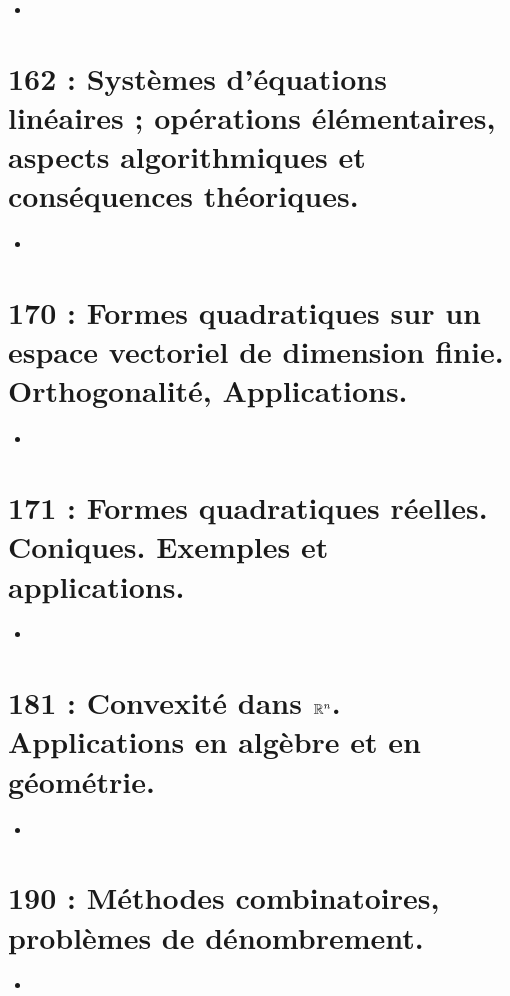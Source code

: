 \documentclass[a4paper,10pt,oneside,twocolumn,landscape]{book}
\begin{document}
\begin{itemize}
	\item 
\end{itemize}

\section{162 : Systèmes d’équations linéaires ; opérations élémentaires, aspects algorithmiques et conséquences théoriques.}

\begin{itemize}
	\item 
\end{itemize}

\section{170 : Formes quadratiques sur un espace vectoriel de dimension finie. Orthogonalité, Applications.}

\begin{itemize}
	\item 
\end{itemize}

\section{171 : Formes quadratiques réelles. Coniques. Exemples et applications.}

\begin{itemize}
	\item 
\end{itemize}


\section{181 : Convexité dans $\mathbb{R}^n$. Applications en algèbre et en géométrie.}

\begin{itemize}
	\item 
\end{itemize}


\section{190 : Méthodes combinatoires, problèmes de dénombrement.}

\begin{itemize}
	\item 
\end{itemize}
\end{document}
